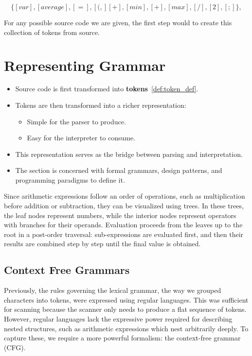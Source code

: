 \documentclass[12pt,a4paper]{article}
\newcommand{\newpar} {
  \vspace{1em}
  \noindent
}
\begin{document}
\[\{[var], [average], [=], [(,] [+], [min], [+], [max], [/], [2], [;]\}, \]

For any possible source code we are given, the first step would to create this collection of tokens from source.

\section{Representing Grammar}
\begin{itemize}
	\item Source code is first transformed into \textbf{tokens}~\ref{def:token_def}.
	\item Tokens are then transformed into a richer representation:
	      \begin{itemize}
		      \item Simple for the parser to produce.
		      \item Easy for the interpreter to consume.
	      \end{itemize}
	\item This representation serves as the bridge between parsing and interpretation.
	\item The section is concerned with formal grammars, design patterns, and programming paradigms to define it.
\end{itemize}

\newpar
Since arithmetic expressions follow an order of operations, such as multiplication before addition or subtraction, they can be visualized using trees.
In these trees, the leaf nodes represent numbers, while the interior nodes represent operators with branches
for their operands. Evaluation proceeds from the leaves up to the root in a post-order traversal:
sub-expressions are evaluated first, and then their results are combined step by step until the final value is obtained.


\subsection{Context Free Grammars}

Previously, the rules governing the lexical grammar, the way we grouped characters into tokens, were
expressed using regular languages. This was sufficient for scanning because the scanner only needs to produce
a flat sequence of tokens. However, regular languages lack the expressive power required for describing
nested structures, such as arithmetic expressions which nest arbitrarily deeply. To capture
these, we require a more powerful formalism: the context-free grammar (CFG).
\end{document}

